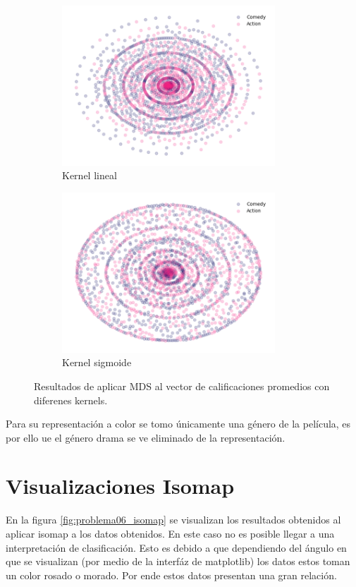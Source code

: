 \begin{figure}[H]
\begin{subfigure}{8cm}
        \includegraphics[width=8cm]{Graphics/Problema_3_2/MDS_linear.png}
        \caption{Kernel lineal}
    \end{subfigure}
    \begin{subfigure}{8cm}
        \includegraphics[width=8cm]{Graphics/Problema_3_2/MDS_sigmod.png}
        \caption{Kernel sigmoide}
    \end{subfigure}
    \caption{Resultados de aplicar MDS al vector de calificaciones promedios con diferenes kernels.}
\end{figure}

Para su representación a color se tomo únicamente una género de la película, es por ello ue el género drama se ve eliminado de la representación.

\section*{Visualizaciones Isomap}

En la figura \ref{fig:problema06_isomap} se visualizan los resultados obtenidos al aplicar isomap a los datos obtenidos. En este caso no es posible llegar a una interpretación de clasificación. Esto es debido a que dependiendo del ángulo en que se visualizan  (por medio de la interfáz de matplotlib) los datos estos toman un color rosado o  morado. Por ende estos datos presentan una gran relación.

